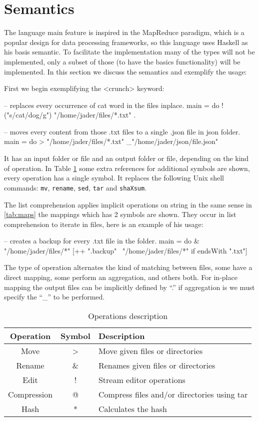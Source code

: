 \documentclass{article}
\begin{document}
\section{Semantics}
\label{sec:semantics}
The language main feature is inspired in the MapReduce paradigm, which is a
popular design for data processing frameworks, so this language uses Haskell as
his basis semantic. To facilitate the implementation many of the types will not
be implemented, only a subset of those (to have the basics functionality) will
be implemented. In this section we discuss the semantics and exemplify the
usage:

First we begin exemplifying the <crunch> keyword:

\begin{code}
-- replaces every occurrence of cat word in the files inplace.
main = do $
    $!("s/cat/dog/g") "/home/jader/files/*.txt" .


-- moves every content from those .txt files to a single .json file in json folder.
main = do $
    $> "/home/jader/files/*.txt" _"/home/jader/json/file.json"
\end{code}

It has an input folder or file and an output folder or file, depending on the
kind of operation.  In Table \ref{tab:operations} some extra references for
additional symbols are shown, every operation has a single symbol. It replaces
the following Unix shell commands: \texttt{mv}, \texttt{rename}, \texttt{sed},
\texttt{tar} and \texttt{shaXsum}.

The list comprehension applies implicit operations on string in the same sense
in \ref{tab:maps} the mappings which has 2 symbols are shown. They occur in
list comprehension to iterate in files, here is an example of his usage:

\begin{code}
-- creates a backup for every .txt file in the folder.
main = do $
    $& "/home/jader/files/*" [++ ".backup" \ "/home/jader/files/*" if endsWith ".txt"]
\end{code}

The type of operation alternates the kind of matching between files, some have
a direct mapping, some perform an aggregation, and others both. For in-place
mapping the output files can be implicitly defined by ``.'' if aggregation is
we must specify the  ``\_'' to be performed.

\begin{table}[ht]
\centering
\caption{Operations description}
\label{tab:operations}
\begin{tabular}{|c|c|l|}
\hline
Operation   & Symbol & Description\\ \hline
Move        & >      & Move given files or directories \\
Rename      & \&     & Renames given files or directories \\
Edit        & !      & Stream editor operations \\
Compression & @      & Compress files and/or directories using tar \\
Hash        & *     & Calculates the hash \\
\hline
\end{tabular}
\end{table}
\end{document}
